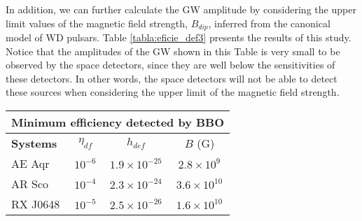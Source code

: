 \documentclass{ws-procs961x669}            %
\begin{document}
In addition, we can further calculate the GW amplitude by considering the upper limit values of the magnetic field strength, $B_{dip}$, inferred from the canonical model of WD pulsars. Table \ref{tabla:eficie_def3} presents the results of this study. Notice that the amplitudes of the GW shown in this Table is very small to be observed by the space detectors, since they are well below the sensitivities of these detectors. In other words, the space detectors will not be able to detect these sources when considering the upper limit of the magnetic field strength.


\begin{table}
{\begin{tabular}{lccc}
\hline
\multicolumn{4}{c}{\textbf{Minimum efficiency detected by BBO}} \\ \hline
\multicolumn{1}{l}{\textbf{Systems}} & \multicolumn{1}{c}{$\eta _{df}$} & \multicolumn{1}{c}{$h_{def}$} & \multicolumn{1}{c}{$B$ (G)} \\ \hline
\multicolumn{1}{l}{AE Aqr} & \multicolumn{1}{c}{$10^{-6}$} & \multicolumn{1}{c}{$1.9 \times 10^{-25}$} & \multicolumn{1}{c}{$2.8 \times 10^{9}$} \\ 
\multicolumn{1}{l}{AR Sco} & \multicolumn{1}{c}{$10^{-4}$} & \multicolumn{1}{c}{$2.3 \times 10^{-24}$} & \multicolumn{1}{c}{$3.6 \times 10^{10}$} \\ 
\multicolumn{1}{l}{RX J0648} & \multicolumn{1}{c}{$10^{-5}$} & \multicolumn{1}{c}{$2.5 \times 10^{-26}$} & \multicolumn{1}{c}{$1.6 \times 10^{10}$} \\ \hline
\end{tabular}
}
\label{tabla:eficie_def2}
\end{table}
\end{document}
